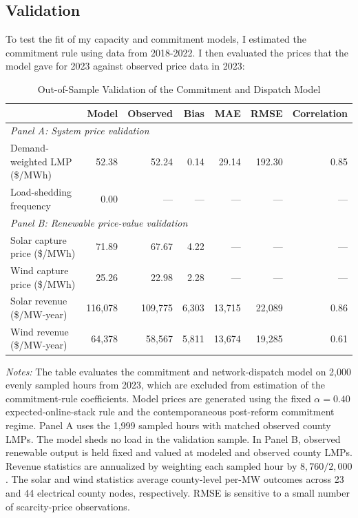 \documentclass[12pt]{article}
\begin{document}
\subsection{Validation}
\label{sec:pq_validation}
To test the fit of my capacity and commitment models, I estimated the commitment rule using data from 2018-2022. I then evaluated the prices that the model gave for 2023 against observed price data in 2023:
\begin{table}[!htbp]
\centering
\caption{Out-of-Sample Validation of the Commitment and Dispatch Model}
\label{tab:commitment_validation}
\begin{threeparttable}

\begin{tabular}{lrrrrrr}
\toprule
& Model & Observed & Bias & MAE & RMSE & Correlation \\
\midrule
\multicolumn{7}{l}{\textit{Panel A: System price validation}} \\
Demand-weighted LMP (\$/MWh)
    & 52.38 & 52.24 & 0.14 & 29.14 & 192.30 & 0.85 \\
\addlinespace
Load-shedding frequency
    & 0.00 & --- & --- & --- & --- & --- \\
\midrule
\multicolumn{7}{l}{\textit{Panel B: Renewable price-value validation}} \\
Solar capture price (\$/MWh)
    & 71.89 & 67.67 & 4.22 & --- & --- & --- \\
Wind capture price (\$/MWh)
    & 25.26 & 22.98 & 2.28 & --- & --- & --- \\
Solar revenue (\$/MW-year)
    & 116{,}078 & 109{,}775 & 6{,}303 & 13{,}715 & 22{,}089 & 0.86 \\
Wind revenue (\$/MW-year)
    & 64{,}378 & 58{,}567 & 5{,}811 & 13{,}674 & 19{,}285 & 0.61 \\
\bottomrule
\end{tabular}

\begin{tablenotes}[flushleft]
\footnotesize
\item \textit{Notes:}
The table evaluates the commitment and network-dispatch model on 2,000
evenly sampled hours from 2023, which are excluded from estimation of the
commitment-rule coefficients. Model prices are generated using the fixed
$\alpha=0.40$ expected-online-stack rule and the contemporaneous post-reform
commitment regime. Panel A uses the 1,999 sampled hours with matched observed
county LMPs. The model sheds no load in the validation sample. In Panel B,
observed renewable output is held fixed and valued at modeled and observed
county LMPs. Revenue statistics are annualized by weighting each sampled hour
by $8{,}760/2{,}000$. The solar and wind statistics average county-level
per-MW outcomes across 23 and 44 electrical county nodes, respectively.
RMSE is sensitive to a small number of scarcity-price observations.
\end{tablenotes}

\end{threeparttable}
\end{table}
\end{document}
